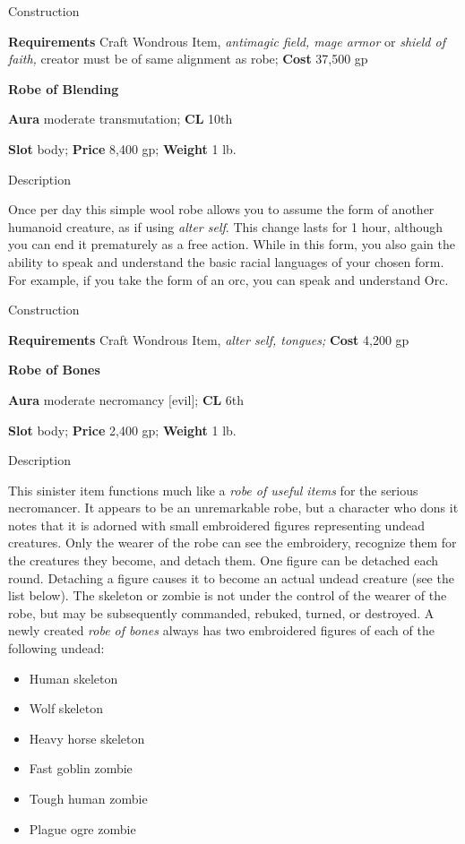 Construction
				
\textbf{Requirements} Craft Wondrous Item, \textit{antimagic field, mage armor }or\textit{ shield of faith, }creator must be of same alignment as robe;\textbf{ Cost }37,500 gp
				
\textbf{Robe of Blending}
				
\textbf{Aura} moderate transmutation;\textbf{ CL }10th
				
\textbf{Slot} body; \textbf{Price} 8,400 gp; \textbf{Weight} 1 lb.
				
Description
				
Once per day this simple wool robe allows you to assume the form of another humanoid creature, as if using \textit{alter self}. This change lasts for 1 hour, although you can end it prematurely as a free action. While in this form, you also gain the ability to speak and understand the basic racial languages of your chosen form. For example, if you take the form of an orc, you can speak and understand Orc. 
				
Construction
				
\textbf{Requirements} Craft Wondrous Item,\textit{ alter self, tongues;}\textbf{ Cost }4,200 gp
				
\textbf{Robe of Bones}
				
\textbf{Aura} moderate necromancy \mbox{$[$}evil\mbox{$]$};\textbf{ CL }6th
				
\textbf{Slot} body; \textbf{Price} 2,400 gp; \textbf{Weight} 1 lb.
				
Description
				
This sinister item functions much like a \textit{robe of useful items} for the serious necromancer. It appears to be an unremarkable robe, but a character who dons it notes that it is adorned with small embroidered figures representing undead creatures. Only the wearer of the robe can see the embroidery, recognize them for the creatures they become, and detach them. One figure can be detached each round. Detaching a figure causes it to become an actual undead creature (see the list below). The skeleton or zombie is not under the control of the wearer of the robe, but may be subsequently commanded, rebuked, turned, or destroyed. A newly created \textit{robe of bones }always has two embroidered figures of each of the following undead:
				\begin{itemize}\item  Human skeleton
				\item  Wolf skeleton
				\item  Heavy horse skeleton
				\item  Fast goblin zombie
				\item  Tough human zombie
				\item  Plague ogre zombie 
\end{itemize}
				
